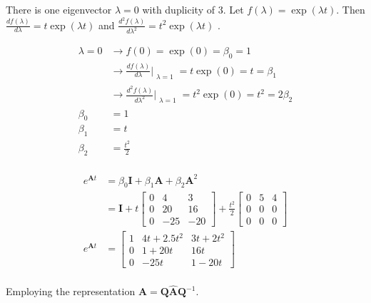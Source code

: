 \begin{itemize}
There is one eigenvector $\lambda = 0$ with duplicity of 3.
 Let $f(\lambda) = \exp(\lambda t)$.
 Then $\frac{d f(\lambda)}{d\lambda} = t \exp(\lambda t)$
 and
 $\frac{d^2 f(\lambda)}{d\lambda^2} = t^2 \exp(\lambda t)$
 .

 \begin{align*}
  \lambda = 0 & \rightarrow f(0) = \exp(0) = \beta_0 = 1\\
    &\rightarrow
    \frac{d f(\lambda)}{d\lambda}\Bigr|_{\substack{\lambda=1}}
    = t \exp(0) = t = \beta_1\\
    &\rightarrow
    \frac{d^2 f(\lambda)}{d\lambda^2}\Bigr|_{\substack{\lambda=1}}
    = t^2 \exp(0)
    = t^2
    = 2 \beta_2\\
  \beta_0 &= 1\\
  \beta_1 &= t\\
  \beta_2 &= \frac{t^2}{2}\\
\end{align*}

\begin{align*}
    e^{\mathbf{A}t} &= \beta_0 \mathbf{I} +  \beta_1 \mathbf{A} + \beta_2 \mathbf{A}^2\\
    &= \mathbf{I} +  t \begin{bmatrix}
           0 & 4 & 3\\
           0 & 20 & 16\\
           0 & -25 & -20
          \end{bmatrix}
+
\frac{t^2}{2}  \begin{bmatrix}
            0 & 5 & 4\\
            0 & 0 & 0\\
            0 & 0 & 0
        \end{bmatrix}\\
         e^{\mathbf{A}t} &=  \begin{bmatrix}
            1 & 4t +2.5 t^2 & 3t +2t^2\\
            0 & 1+20t & 16t \\
            0 & -25 t & 1-20t
        \end{bmatrix}\\
 \end{align*}

  Employing the representation $\mathbf{A} = \mathbf{Q} \hat{\mathbf{A}} \mathbf{Q}^{-1} $.


\end{itemize}
